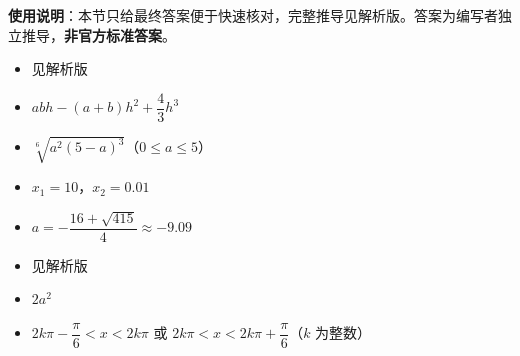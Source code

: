 
\begin{gknotice}
\textbf{使用说明}：本节只给最终答案便于快速核对，完整推导见解析版。答案为编写者独立推导，\textbf{非官方标准答案}。
\end{gknotice}

\begin{itemize}[leftmargin=2.6em]
  \item[\textbf{1.}] 见解析版
  \item[\textbf{2.}] $abh-(a+b)h^{2}+\dfrac{4}{3}h^{3}$
  \item[\textbf{3.}] $\sqrt[6]{a^{2}(5-a)^{3}}$（$0\le a\le5$）
  \item[\textbf{4.}] $x_{1}=10$，$x_{2}=0.01$
  \item[\textbf{5.}] $a=-\dfrac{16+\sqrt{415}}{4}\approx-9.09$
  \item[\textbf{6.}] 见解析版
  \item[\textbf{7.}] $2a^{2}$
  \item[\textbf{8.}] $2k\pi-\dfrac{\pi}{6}<x<2k\pi$ 或 $2k\pi<x<2k\pi+\dfrac{\pi}{6}$（$k$ 为整数）
\end{itemize}
